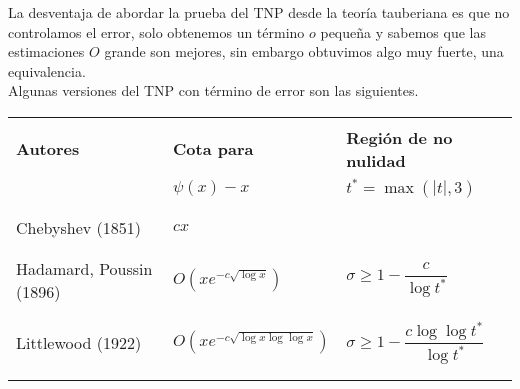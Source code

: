 \begin{note}
    La desventaja de abordar la prueba del TNP desde la teoría tauberiana es que no controlamos el error, solo obtenemos un término $o$ pequeña y sabemos que las estimaciones $O$ grande son mejores, sin embargo obtuvimos algo muy fuerte, una equivalencia.\\

    Algunas versiones del TNP con término de error son las siguientes.

\begin{center}
\begin{table}[h!]
\begin{tabular}{|l|l|l|}
\hline
& & \vspace*{-0.2cm}\\
\hspace{1.5cm}\textbf{Autores} & \hspace{1.5cm}\textbf{Cota para} & \hspace{0.12cm}\textbf{Región de no nulidad} \\
 & \hspace*{1.75cm}\textbf{$\psi(x) - x$}& \hspace{0.7cm}$t^* = \max(|t|, 3)$\\
& & \vspace*{-0.2cm}\\
\hline
& & \vspace*{-0.2cm}\\
Chebyshev (1851) & \hspace{2.2cm}$cx$ &  \\
& & \vspace*{-0.2cm}\\
\hline
& & \vspace*{-0.2cm}\\
Hadamard, Poussin (1896) & \hspace*{0.8cm}$O\left( \displaystyle xe^{\displaystyle-c\sqrt{\log x}} \right)$ & $\sigma \geq 1 - \dfrac{c}{\log t^*}$ \\
& & \vspace*{-0.2cm}\\
\hline
& & \vspace*{-0.2cm}\\
Littlewood (1922) & $O\left( \displaystyle xe^{\displaystyle-c\sqrt{\log x \log \log x}} \right)$ & $\sigma \geq 1 - \dfrac{c \log \log t^*}{\log t^*}$ \\ 
& & \vspace*{-0.2cm}\\
\hline
& & \vspace*{-0.2cm}\\

\end{tabular}
\end{table}
\end{center}
\end{note}
